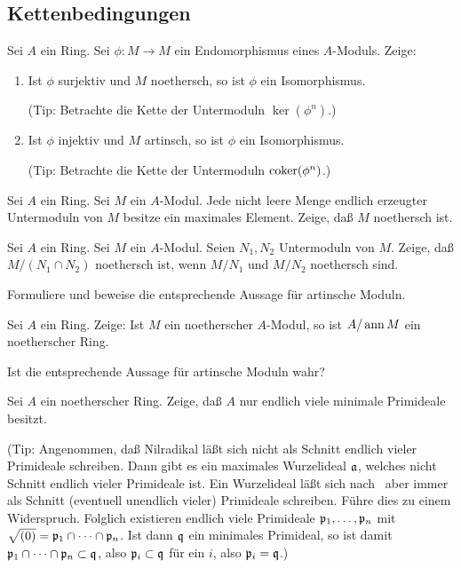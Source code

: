 \subsection{Kettenbedingungen}

\begin{exercise}
	Sei \(A\) ein Ring. Sei \(\phi\colon M \to M\) ein Endomorphismus eines \(A\)-Moduls.
	Zeige:
	\begin{enumerate}
	\item
		Ist \(\phi\) surjektiv und \(M\) noethersch, so ist \(\phi\) ein Isomorphismus.
		
		(Tip: Betrachte die Kette der Untermoduln \(\ker(\phi^n)\).)
	\item
		Ist \(\phi\) injektiv und \(M\) artinsch, so ist \(\phi\) ein Isomorphismus.
		
		(Tip: Betrachte die Kette der Untermoduln \(\operatorname{coker}(\phi^n)\).)
	\end{enumerate}
\end{exercise}

\begin{exercise}
	Sei \(A\) ein Ring. Sei \(M\) ein \(A\)-Modul. Jede nicht leere Menge endlich erzeugter
	Untermoduln von \(M\) besitze ein maximales Element. Zeige, daß \(M\) noethersch ist.
\end{exercise}

\begin{exercise}
	Sei \(A\) ein Ring. Sei \(M\) ein \(A\)-Modul. Seien \(N_1, N_2\) Untermoduln von \(M\).
	Zeige, daß \(M/(N_1 \cap N_2)\) noethersch ist, wenn \(M/N_1\) und \(M/N_2\) noethersch
	sind.
	
	Formuliere und beweise die entsprechende Aussage für artinsche Moduln.
\end{exercise}

\begin{exercise}
	Sei \(A\) ein Ring. Zeige: Ist \(M\) ein noetherscher \(A\)-Modul, so ist \(A/\operatorname{ann} M\)
	ein noetherscher Ring.
	
	Ist die entsprechende Aussage für artinsche Moduln wahr?
\end{exercise}

\begin{exercise}
	Sei \(A\) ein noetherscher Ring. Zeige, daß \(A\) nur endlich viele minimale Primideale
	besitzt.
	
	(Tip: Angenommen, daß Nilradikal läßt sich nicht als Schnitt endlich vieler Primideale schreiben.
	Dann gibt es ein maximales Wurzelideal \(\mathfrak{a}\), welches nicht Schnitt endlich vieler Primideale ist.
	Ein Wurzelideal läßt sich nach~ aber immer als Schnitt (eventuell unendlich vieler) Primideale 
	schreiben. Führe dies zu einem Widerspruch. Folglich existieren endlich viele Primideale \(\mathfrak{p}_1, \dotsc,
	\mathfrak{p}_n\) mit \(\sqrt{(0)} = \mathfrak{p}_1 \cap \dotsb \cap \mathfrak{p}_n\). Ist dann \(\mathfrak{q}\) ein minimales Primideal, so 
	ist damit \(\mathfrak{p}_1 \cap \dotsb \cap \mathfrak{p}_n \subset \mathfrak{q}\), also \(\mathfrak{p}_i \subset \mathfrak{q}\) für
	ein \(i\), also \(\mathfrak{p}_i = \mathfrak{q}\).)
\end{exercise}

